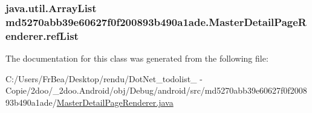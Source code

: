 \hypertarget{classmd5270abb39e60627f0f200893b490a1ade_1_1_master_detail_page_renderer_395b49a7122df4c3416eb8930f6d33c3}{
\subsubsection[{refList}]{\setlength{\rightskip}{0pt plus 5cm}java.util.ArrayList {\bf md5270abb39e60627f0f200893b490a1ade.MasterDetailPageRenderer.refList}}}
\label{classmd5270abb39e60627f0f200893b490a1ade_1_1_master_detail_page_renderer_395b49a7122df4c3416eb8930f6d33c3}




The documentation for this class was generated from the following file:\begin{CompactItemize}
\item 
C:/Users/FrBea/Desktop/rendu/DotNet\_\-todolist\_ - Copie/2doo/\_\-2doo.Android/obj/Debug/android/src/md5270abb39e60627f0f200893b490a1ade/\hyperlink{_master_detail_page_renderer_8java}{MasterDetailPageRenderer.java}\end{CompactItemize}
